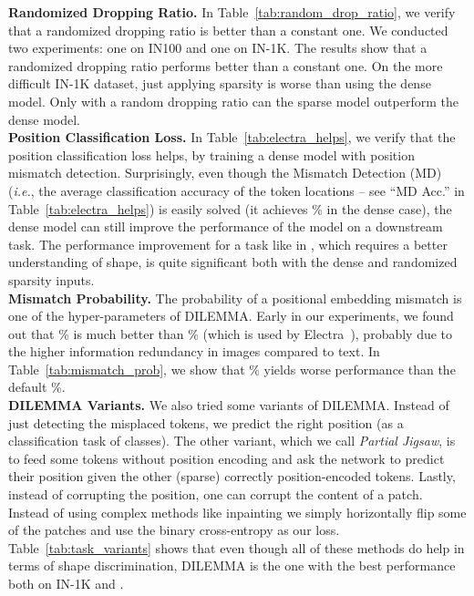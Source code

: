 \documentclass[letterpaper]{article} \usepackage{aaai23}  \usepackage{times}  \usepackage{helvet}  \usepackage{courier}  \usepackage[hyphens]{url}  \usepackage{graphicx} \urlstyle{rm} \def\UrlFont{\rm}  \usepackage{natbib}  \usepackage{caption} \frenchspacing  \setlength{\pdfpagewidth}{8.5in}  \setlength{\pdfpageheight}{11in}  \usepackage{algorithm}
\newcommand{\methodname}{DILEMMA}
\begin{document}
\noindent\textbf{Randomized Dropping Ratio.}
In Table~\ref{tab:random_drop_ratio}, we verify that a randomized dropping ratio is better than a constant one. We conducted two experiments: one on IN100 and one on IN-1K. The results show that a randomized dropping ratio performs better than a constant one. On the more difficult IN-1K dataset, just applying sparsity is worse than using the dense model. Only with a random dropping ratio can the sparse model outperform the dense model.\\

\noindent\textbf{Position Classification Loss.} In Table~\ref{tab:electra_helps}, we verify that the position classification loss helps, by training a dense model with position mismatch detection. Surprisingly, even though the Mismatch Detection (MD) (\emph{i.e.}, the average classification accuracy of the token locations -- see ``MD Acc.'' in Table~\ref{tab:electra_helps}) is easily solved (it achieves \% in the dense case),
the dense model can still improve the performance of the model on a downstream task. The performance improvement for a task like in , which requires a better understanding of shape, is quite significant both with the dense and randomized sparsity inputs.\\

\noindent\textbf{Mismatch Probability.} The probability of a positional embedding mismatch  is one of the hyper-parameters of {\methodname}. Early in our experiments, we found out that \% is much better than \% (which is used by Electra~\cite{clark2020electra}), probably due to the higher information redundancy in images compared to text. In Table~\ref{tab:mismatch_prob}, we show that \% yields worse performance than the default \%.\\

\noindent\textbf{{\methodname} Variants.}
We also tried some variants of \methodname. Instead of just detecting the misplaced tokens, we predict the right position (as a classification task of  classes). The other variant, which we call \emph{Partial Jigsaw}, is to feed some tokens without position encoding and ask the network to predict their position given the other (sparse) correctly position-encoded tokens. Lastly, instead of corrupting the position, one can corrupt the content of a patch. Instead of using complex methods like inpainting we simply horizontally flip some of the patches and use the binary cross-entropy as our loss. Table~\ref{tab:task_variants} shows that even though all of these methods do help in terms of shape discrimination, {\methodname} is the one with the best performance both on IN-1K and .\\
\end{document}

